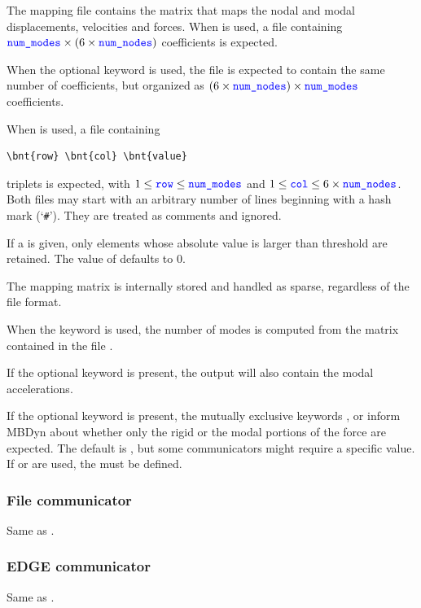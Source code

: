 The mapping file contains the matrix that maps the nodal and modal
displacements, velocities and forces.
When  is used, a file containing
$\textcolor{blue}{\texttt{num\_modes}} \times (6\times\textcolor{blue}{\texttt{num\_nodes}})$ coefficients is expected.

When the optional  keyword is used, the file is expected to contain
the same number of coefficients, but organized as $(6\times\textcolor{blue}{\texttt{num\_nodes}}) \times \textcolor{blue}{\texttt{num\_modes}}$ coefficients.

When  is used, a file containing
\begin{Verbatim}[commandchars=\\\{\}]
\bnt{row} \bnt{col} \bnt{value}
\end{Verbatim}
triplets is expected, with $1 \le \textcolor{blue}{\texttt{row}} \le \textcolor{blue}{\texttt{num\_modes}}$
and $1 \le \textcolor{blue}{\texttt{col}} \le 6\times\textcolor{blue}{\texttt{num\_nodes}}$.
Both files may start with an arbitrary number of lines beginning
with a hash mark (`\texttt{\#}').
They are treated as comments and ignored.

If a  is given, only elements whose absolute value
is larger than threshold are retained.
The value of  defaults to 0.

The mapping matrix is internally stored and handled as sparse,
regardless of the file format.

When the keyword  is used, the number of modes 
is computed from the matrix contained in the file .

If the optional keyword  is present,
the output will also contain the modal accelerations.

If the optional keyword  is present,
the mutually exclusive keywords ,  or 
inform MBDyn about whether only the rigid or the modal portions
of the force are expected.
The default is , but some communicators might require
a specific value.
If  or  are used, the  must be defined.



\subsubsection{File communicator}
Same as .

\subsubsection{EDGE communicator}
Same as .

